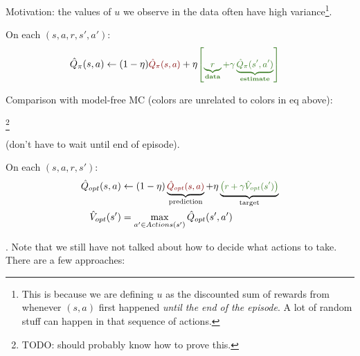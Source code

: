 \documentclass[11pt]{article}
\newcommand\myspace[1][]{\vspace{#1\bigskipamount}\Needspace{10\baselineskip}}
\begin{document}
\begin{algorithm}
	Motivation: the values of $u$ we observe in the data often have high variance\footnote{This is because we are defining $u$ as the discounted sum of rewards from whenever $(s, a)$ first happened \textit{until the end of the episode}. A lot of random stuff can happen in that sequence of actions.}. 
	
	\tcblower 
	
	On each $(s, a, r, s', a')$:
	\begin{align}
		\hat Q_{\pi}(s, a)
			&\leftarrow (1 - \eta) \mred{ \hat Q_{\pi}(s, a) }
				+ \eta \mgreen{ \left[
					\underbrace{ r }_\text{data} + 
					\gamma \underbrace{ \hat Q_{\pi}(s', a') }_\text{estimate}
				\right] }
	\end{align}
	
	Comparison with model-free MC (colors are unrelated to colors in eq above):
	\begin{compactitem}
		\item {}\footnote{TODO: should probably know how to prove this.}
		\item {}
		\item {} (don't have to wait until end of episode). 
	\end{compactitem}
\end{algorithm}

\begin{algorithm}
	On each $(s, a, r, s')$:
	\begin{align}
		\hat Q_{opt}(s, a)
			&\leftarrow (1- \eta) \underbrace{ \mred{  \hat Q_{opt}(s, a)    }   }_\text{prediction}
			+ \eta \underbrace{   \mgreen{  \left(
				r + \gamma \hat V_{opt}(s')
			\right) } }_\text{target} \\
		\hat V_{opt}(s')
			&= \max_{a' \in Actions(s')} \hat Q_{opt}(s', a')
	\end{align}
\end{algorithm}

\myspace
{}. Note that we still have not talked about how to decide what actions to take. There are a few approaches:
\end{document}
